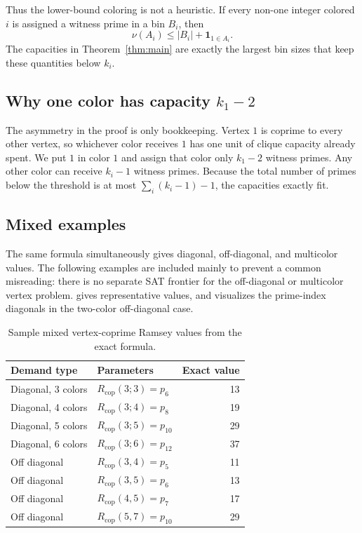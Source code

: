 \documentclass[11pt]{article}
\theoremstyle{plain}
\theoremstyle{definition}
\theoremstyle{remark}
\newcommand{\Rcop}{R_{\mathrm{cop}}}
\begin{document}
Thus the lower-bound coloring is not a heuristic.  If every non-one integer
colored $i$ is assigned a witness prime in a bin $B_i$, then
\[
  \nu(A_i)\le |B_i|+\mathbf{1}_{1\in A_i}.
\]
The capacities in Theorem~\ref{thm:main} are exactly the largest bin sizes
that keep these quantities below $k_i$.

\subsection{\texorpdfstring{Why one color has capacity $k_1-2$}{Why one color has capacity k1-2}}

The asymmetry in the proof is only bookkeeping.  Vertex $1$ is coprime to
every other vertex, so whichever color receives $1$ has one unit of clique
capacity already spent.  We put $1$ in color $1$ and assign that color only
$k_1-2$ witness primes.  Any other color can receive $k_i-1$ witness primes.
Because the total number of primes below the threshold is at most
$\sum_i(k_i-1)-1$, the capacities exactly fit.

\subsection{Mixed examples}

The same formula simultaneously gives diagonal, off-diagonal, and multicolor
values.  The following examples are included mainly to prevent a common
misreading: there is no separate SAT frontier for the off-diagonal or
multicolor vertex problem.   gives representative
values, and  visualizes the prime-index
diagonals in the two-color off-diagonal case.

\begin{table}[htbp]
\centering
\caption{Sample mixed vertex-coprime Ramsey values from the exact formula.}
\label{tab:mixed-examples}
\begin{tabular}{llr}
\toprule
Demand type & Parameters & Exact value \\
\midrule
Diagonal, 3 colors & $\Rcop(3;3)=p_6$ & 13 \\
Diagonal, 4 colors & $\Rcop(3;4)=p_8$ & 19 \\
Diagonal, 5 colors & $\Rcop(3;5)=p_{10}$ & 29 \\
Diagonal, 6 colors & $\Rcop(3;6)=p_{12}$ & 37 \\
Off diagonal & $\Rcop(3,4)=p_5$ & 11 \\
Off diagonal & $\Rcop(3,5)=p_6$ & 13 \\
Off diagonal & $\Rcop(4,5)=p_7$ & 17 \\
Off diagonal & $\Rcop(5,7)=p_{10}$ & 29 \\
\bottomrule
\end{tabular}


\end{table}
\end{document}
